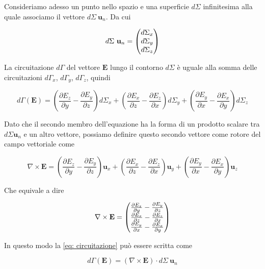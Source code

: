 Consideriamo adesso un punto nello spazio e una superficie $d \Sigma $ infinitesima alla quale associamo il vettore $d \Sigma \ \mathbf{u}_n$. Da cui 

\begin{equation*}
    d \Sigma \ \mathbf{u}_n = \begin{pmatrix} d \Sigma_x \\ d \Sigma_y \\ d \Sigma_z \end{pmatrix}
\end{equation*}

La circuitazione $d \Gamma$ del vettore $\mathbf{E}$ lungo il contorno $d \Sigma$ è uguale alla somma delle circuitazioni $d \Gamma_x$, $d \Gamma_y$, $d \Gamma_z $, quindi 

\begin{equation}
    d\Gamma(\mathbf{E}) = (\frac{\partial E_z}{\partial y} - \frac{\partial E_y}{\partial z} ) d \Sigma_x + (\frac{\partial E_x}{\partial z} - \frac{\partial E_z}{\partial x} ) d \Sigma_y + (\frac{\partial E_y}{\partial x} - \frac{\partial E_x}{\partial y} ) d \Sigma_z
    \label{eq: circuitazione}
\end{equation}

Dato che il secondo membro dell'equazione ha la forma di un prodotto scalare tra $d \Sigma \mathbf{u}_n$ e un altro vettore, possiamo definire questo secondo vettore come rotore del campo vettoriale  come 

\begin{equation}
     \nabla \times \mathbf{E} = (\frac{\partial E_z}{\partial y} - \frac{\partial E_y}{\partial z} ) \mathbf{u}_x + (\frac{\partial E_x}{\partial z} - \frac{\partial E_z}{\partial x} ) \mathbf{u}_y + (\frac{\partial E_y}{\partial x} - \frac{\partial E_x}{\partial y} ) \mathbf{u}_z
\end{equation}

Che equivale a dire 

\begin{equation*}
     \nabla \times \mathbf{E} = \begin{pmatrix} \frac{\partial E_z}{\partial y} - \frac{\partial E_y}{\partial z} \\ \frac{\partial E_x}{\partial z} - \frac{\partial E_z}{\partial x} \\ \frac{\partial E_y}{\partial x} - \frac{\partial E_x}{\partial y} \end{pmatrix}
\end{equation*}

In questo modo la \ref{eq: circuitazione} può essere scritta come 

\begin{equation}
    d \Gamma (\mathbf{E}) = (\nabla \times \mathbf{E}) \cdot d \Sigma \ \mathbf{u}_n
\end{equation}

